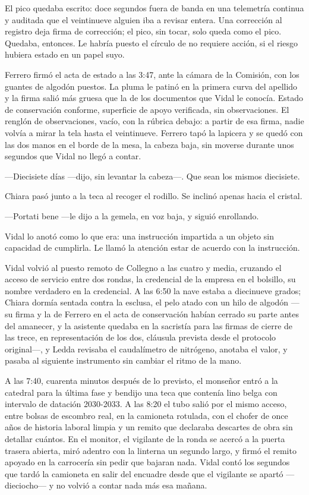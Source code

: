 El pico quedaba escrito: doce segundos fuera de banda en una telemetría continua y auditada que el veintinueve alguien iba a revisar entera. Una corrección al registro deja firma de corrección; el pico, sin tocar, solo queda como el pico. Quedaba, entonces. Le habría puesto el círculo de no requiere acción, si el riesgo hubiera estado en un papel suyo.

Ferrero firmó el acta de estado a las 3:47, ante la cámara de la Comisión, con los guantes de algodón puestos. La pluma le patinó en la primera curva del apellido y la firma salió más gruesa que la de los documentos que Vidal le conocía. Estado de conservación conforme, superficie de apoyo verificada, sin observaciones. El renglón de observaciones, vacío, con la rúbrica debajo: a partir de esa firma, nadie volvía a mirar la tela hasta el veintinueve. Ferrero tapó la lapicera y se quedó con las dos manos en el borde de la mesa, la cabeza baja, sin moverse durante unos segundos que Vidal no llegó a contar.

---Diecisiete días ---dijo, sin levantar la cabeza---. Que sean los mismos diecisiete.

Chiara pasó junto a la teca al recoger el rodillo. Se inclinó apenas hacia el cristal.

---Portati bene ---le dijo a la gemela, en voz baja, y siguió enrollando.

Vidal lo anotó como lo que era: una instrucción impartida a un objeto sin capacidad de cumplirla. Le llamó la atención estar de acuerdo con la instrucción.


\scenebreak


Vidal volvió al puesto remoto de Collegno a las cuatro y media, cruzando el acceso de servicio entre dos rondas, la credencial de la empresa en el bolsillo, su nombre verdadero en la credencial. A las 6:50 la nave estaba a diecinueve grados; Chiara dormía sentada contra la esclusa, el pelo atado con un hilo de algodón ---su firma y la de Ferrero en el acta de conservación habían cerrado su parte antes del amanecer, y la asistente quedaba en la sacristía para las firmas de cierre de las trece, en representación de los dos, cláusula prevista desde el protocolo original---, y Ledda revisaba el caudalímetro de nitrógeno, anotaba el valor, y pasaba al siguiente instrumento sin cambiar el ritmo de la mano.

A las 7:40, cuarenta minutos después de lo previsto, el monseñor entró a la catedral para la última fase y bendijo una teca que contenía lino belga con intervalo de datación 2030-2033. A las 8:20 el tubo salió por el mismo acceso, entre bolsas de escombro real, en la camioneta rotulada, con el chofer de once años de historia laboral limpia y un remito que declaraba descartes de obra sin detallar cuántos. En el monitor, el vigilante de la ronda se acercó a la puerta trasera abierta, miró adentro con la linterna un segundo largo, y firmó el remito apoyado en la carrocería sin pedir que bajaran nada. Vidal contó los segundos que tardó la camioneta en salir del encuadre desde que el vigilante se apartó ---dieciocho--- y no volvió a contar nada más esa mañana.

